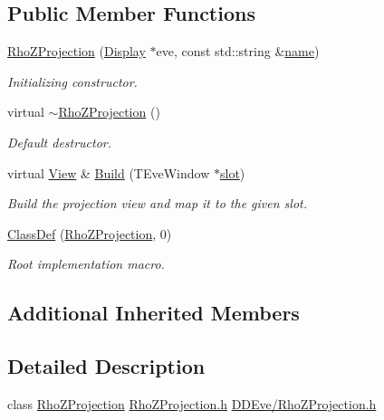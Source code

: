 \subsection*{Public Member Functions}
\begin{DoxyCompactItemize}
\item 
\hyperlink{class_d_d4hep_1_1_rho_z_projection_a53e97713415f13369aa528096a8e5a6b}{Rho\+Z\+Projection} (\hyperlink{class_d_d4hep_1_1_display}{Display} $\ast$eve, const std\+::string \&\hyperlink{class_d_d4hep_1_1_view_ae369eadf16399a6bf34f1ce491b7a788}{name})
\begin{DoxyCompactList}\small\item\em Initializing constructor. \end{DoxyCompactList}\item 
virtual \hyperlink{class_d_d4hep_1_1_rho_z_projection_a196da05dd078d07f9f05e2a6b3eb9f3a}{$\sim$\+Rho\+Z\+Projection} ()
\begin{DoxyCompactList}\small\item\em Default destructor. \end{DoxyCompactList}\item 
virtual \hyperlink{class_d_d4hep_1_1_view}{View} \& \hyperlink{class_d_d4hep_1_1_rho_z_projection_adc2e30a682bc645b5433d055774930ef}{Build} (T\+Eve\+Window $\ast$\hyperlink{_multi_view_8cpp_a402e7b855ac7bcf09e2ecf5e98220a11}{slot})
\begin{DoxyCompactList}\small\item\em Build the projection view and map it to the given slot. \end{DoxyCompactList}\item 
\hyperlink{class_d_d4hep_1_1_rho_z_projection_aef14a29e5037f6ac2df7eb09a8fa6c84}{Class\+Def} (\hyperlink{class_d_d4hep_1_1_rho_z_projection}{Rho\+Z\+Projection}, 0)
\begin{DoxyCompactList}\small\item\em Root implementation macro. \end{DoxyCompactList}\end{DoxyCompactItemize}
\subsection*{Additional Inherited Members}


\subsection{Detailed Description}
class \hyperlink{class_d_d4hep_1_1_rho_z_projection}{Rho\+Z\+Projection} \hyperlink{_rho_z_projection_8h}{Rho\+Z\+Projection.\+h} \hyperlink{_rho_z_projection_8h}{D\+D\+Eve/\+Rho\+Z\+Projection.\+h} 

